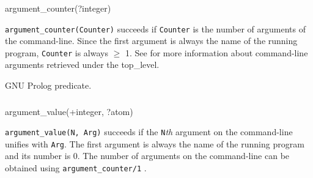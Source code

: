 \subsubsection{\label{argument-counter/1}}

\begin{TemplatesOneCol}
argument\_counter(?integer)

\end{TemplatesOneCol}

\Description

\texttt{argument\_counter(Counter)} succeeds if \texttt{Counter} is the
number of arguments of the command-line. Since the first argument is always
the name of the running program, \texttt{Counter} is always $\geq$ 1. See
 for more information about
command-line arguments retrieved under the top\_level.


\begin{PlErrors}


\end{PlErrors}

\Portability

GNU Prolog predicate.

\subsubsection{\label{argument-value/2}}

\begin{TemplatesOneCol}
argument\_value(+integer, ?atom)

\end{TemplatesOneCol}

\Description

\texttt{argument\_value(N, Arg)} succeeds if the \texttt{N}\emph{th}
argument on the command-line unifies with \texttt{Arg}. The first argument
is always the name of the running program and its number is 0. The number of
arguments on the command-line can be obtained using
\texttt{argument\_counter/1} .

\begin{PlErrors}





\end{PlErrors}

